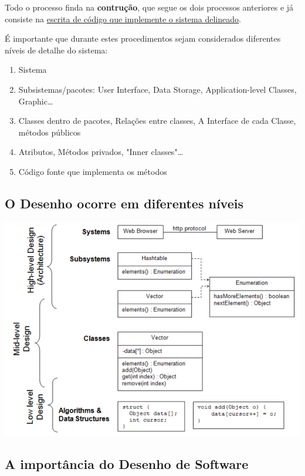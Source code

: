 \documentclass{article}
\begin{document}
\vspace{2mm}
\par
Todo o processo finda na \textbf{contrução}, que segue os dois processos
anteriores e já consiste na \uline{escrita de código que implemente
o sistema delineado}.

\vspace{2mm}
\par
É importante que durante estes procedimentos sejam considerados diferentes
níveis de detalhe do sistema:

\begin{enumerate}
    \item Sistema
    \item Subsistemas/pacotes: User Interface, Data Storage, Application-level Classes, Graphic\dots
    \item Classes dentro de pacotes, Relações entre classes, A Interface de cada Classe, métodos públicos 
    \item Atributos, Métodos privados, "Inner classes"\dots
    \item Código fonte que implementa os métodos
\end{enumerate}

\subsection{O Desenho ocorre em diferentes níveis}
\vspace{2mm}
\begin{center}
    \includegraphics[scale=0.3]{Images/1.png}
\end{center}

\subsection{A importância do Desenho de Software}
\end{document}

